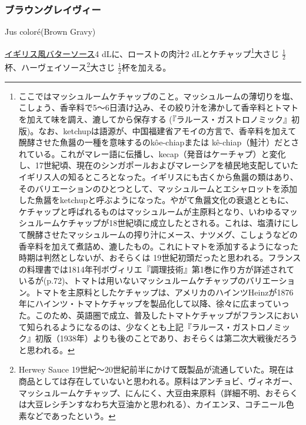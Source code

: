 \begin{recette}
\atoaki{}

\hypertarget{brown-gravy}{%
\subsubsection{ブラウングレイヴィー}\label{brown-gravy}}

\begin{frsubenv}

Jus coloré\hspace{1em}\normalfont(Brown Gravy)

\end{frsubenv}


\protect\hyperlink{butter-sauce}{イギリス風バターソース}4
dLに、ローストの肉汁2 dLとケチャップ\footnote{ここではマッシュルームケチャップのこと。マッシュルームの薄切りを塩、こしょう、香辛料で5〜6日漬け込み、その絞り汁を沸かして香辛料とトマトを加えて味を調え、漉してから保存する
  (『ラルース・ガストロノミック』初版)。なお、ketchupは語源が、中国福建省アモイの方言で、香辛料を加えて醗酵させた魚醤の一種を意味するのkôe-chiapまたは
  kê-chiap（鮭汁）だとされている。これがマレー語に伝播し、kecap（発音はケーチャプ）と変化し、17世紀頃、現在のシンガポールおよびマレーシアを植民地支配していたイギリス人の知るところとなった。イギリスにも古くから魚醤の類はあり、そのバリエーションのひとつとして、マッシュルームとエシャロットを添加した魚醤をketchupと呼ぶようになった。やがて魚醤文化の衰退とともに、ケチャップと呼ばれるものはマッシュルームが主原料となり、いわゆるマッシュルームケチャップが18世紀頃に成立したとされる。これは、塩漬けにして醗酵させたマッシュルームの搾り汁にメース、ナツメグ、こしょうなどの香辛料を加えて煮詰め、漉したもの。これにトマトを添加するようになった時期は判然としないが、おそらくは
  19世紀初頭だったと思われる。フランスの料理書では1814年刊ボヴィリエ『調理技術』第1巻に作り方が詳述されているが(p.72)、トマトは用いないマッシュルームケチャップのバリエーション。トマトを主原料としたケチャップは、アメリカのハインツHeinzが1876年にハインツ・トマトケチャップを製品化して以降、徐々に広まっていった。このため、英語圏で成立、普及したトマトケチャップがフランスにおいて知られるようになるのは、少なくとも上記『ラルース・ガストロノミック』初版（1938年）よりも後のことであり、おそらくは第二次大戦後だろうと思われる。}大さじ
\(\frac{1}{2}\)杯、ハーヴェイソース\footnote{Herwey Sauce
  19世紀〜20世紀前半にかけて既製品が流通していた。現在は商品としては存在していないと思われる。原料はアンチョビ、ヴィネガー、マッシュルームケチャップ、にんにく、大豆由来原料（詳細不明、おそらくは大豆レシチンすなわち大豆油かと思われる）、カイエンヌ、コチニール色素などであったという。}大さじ
\(\frac{1}{2}\)杯を加える。


\end{recette}

